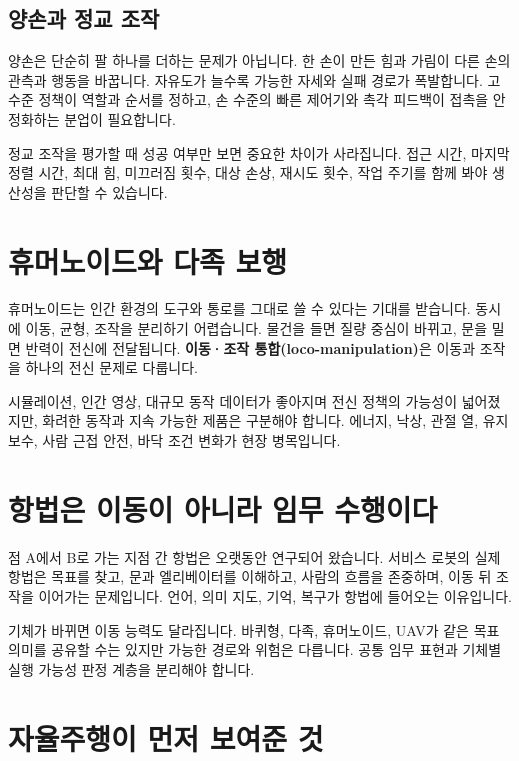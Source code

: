 \documentclass[11pt,openany]{book}
\newcommand{\keyterm}[1]{{\sffamily\bfseries\color{deepblue}#1}}
\begin{document}
\subsection{양손과 정교 조작}

양손은 단순히 팔 하나를 더하는 문제가 아닙니다. 한 손이 만든 힘과 가림이 다른 손의 관측과 행동을 바꿉니다. 자유도가 늘수록 가능한 자세와 실패 경로가 폭발합니다. 고수준 정책이 역할과 순서를 정하고, 손 수준의 빠른 제어기와 촉각 피드백이 접촉을 안정화하는 분업이 필요합니다.

\begin{fieldbox}
정교 조작을 평가할 때 성공 여부만 보면 중요한 차이가 사라집니다. 접근 시간, 마지막 정렬 시간, 최대 힘, 미끄러짐 횟수, 대상 손상, 재시도 횟수, 작업 주기를 함께 봐야 생산성을 판단할 수 있습니다.
\end{fieldbox}

\section{휴머노이드와 다족 보행}

휴머노이드는 인간 환경의 도구와 통로를 그대로 쓸 수 있다는 기대를 받습니다. 동시에 이동, 균형, 조작을 분리하기 어렵습니다. 물건을 들면 질량 중심이 바뀌고, 문을 밀면 반력이 전신에 전달됩니다. \keyterm{이동·조작 통합(loco-manipulation)}은 이동과 조작을 하나의 전신 문제로 다룹니다.

시뮬레이션, 인간 영상, 대규모 동작 데이터가 좋아지며 전신 정책의 가능성이 넓어졌지만, 화려한 동작과 지속 가능한 제품은 구분해야 합니다. 에너지, 낙상, 관절 열, 유지보수, 사람 근접 안전, 바닥 조건 변화가 현장 병목입니다.

\section{항법은 이동이 아니라 임무 수행이다}

점 A에서 B로 가는 지점 간 항법은 오랫동안 연구되어 왔습니다. 서비스 로봇의 실제 항법은 목표를 찾고, 문과 엘리베이터를 이해하고, 사람의 흐름을 존중하며, 이동 뒤 조작을 이어가는 문제입니다. 언어, 의미 지도, 기억, 복구가 항법에 들어오는 이유입니다.

기체가 바뀌면 이동 능력도 달라집니다. 바퀴형, 다족, 휴머노이드, UAV가 같은 목표 의미를 공유할 수는 있지만 가능한 경로와 위험은 다릅니다. 공통 임무 표현과 기체별 실행 가능성 판정 계층을 분리해야 합니다.

\section{자율주행이 먼저 보여준 것}
\end{document}
